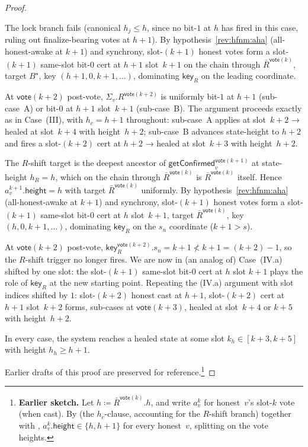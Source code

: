 \documentclass{article}
\newcommand{\height}{\mathsf{height}}
\newcommand{\key}{\mathsf{key}}
\newcommand{\vote}{\mathsf{vote}}
\newcommand{\comm}[1]{\bar{#1}}
\newcommand{\getConfirmed}{\textsf{getConfirmed}\xspace}
\theoremstyle{plain}
\theoremstyle{definition}
\theoremstyle{remark}
\newcommand{\AHA}{all-honest-awake\xspace}
\begin{document}
\begin{proof}
\begin{description}
\begin{description}
The lock branch fails (canonical $h_j \leq h$, since no bit-$1$ at $h$ has fired in this case, ruling out finalize-bearing votes at $h+1$). By hypothesis~\ref{rev:hfnm:aha} (\AHA at $k+1$) and synchrony, slot-$(k+1)$ honest votes form a slot-$(k+1)$ same-slot bit-$0$ cert at $h+1$ slot~$k+1$ on the chain through $\comm{R}^{\vote(k)}$, target $B^{\star}$, key $(h+1, 0, k+1, \ldots)$, dominating $\key_R$ on the leading coordinate.

At $\vote(k+2)$ post-vote, $\Sigma_v.R^{\vote(k+2)}$ is uniformly bit-$1$ at $h+1$ (sub-case~A) or bit-$0$ at $h+1$ slot~$k+1$ (sub-case~B). The argument proceeds exactly as in Case~(III), with $h_c = h+1$ throughout: sub-case~A applies  at slot~$k+2$ → healed at slot~$k+4$ with height~$h+2$; sub-case~B advances state-height to $h+2$ and fires a slot-$(k+2)$ cert at $h+2$ → healed at slot~$k+3$ with height~$h+2$.

\item[{(IV.b): $s < k$ — $R$-shift fires.}]\hfill

The $R$-shift target is the deepest ancestor of $\getConfirmed_v^{\vote(k+1)}$ at state-height $h_R = h$, which on the chain through $\comm{R}^{\vote(k)}$ is $\comm{R}^{\vote(k)}$ itself. Hence $a^{k+1}_v.\height = h$ with target $\comm{R}^{\vote(k)}$ uniformly. By hypothesis~\ref{rev:hfnm:aha} (\AHA at $k+1$) and synchrony, slot-$(k+1)$ honest votes form a slot-$(k+1)$ same-slot bit-$0$ cert at $h$ slot~$k+1$, target $\comm{R}^{\vote(k)}$, key $(h, 0, k+1, \ldots)$, dominating $\key_R$ on the $s_n$ coordinate ($k+1 > s$).

At $\vote(k+2)$ post-vote, $\key_R^{\vote(k+2)}.s_n = k+1 \not< k+1 = (k+2) - 1$, so the $R$-shift trigger no longer fires. We are now in (an analog of) Case~(IV.a) shifted by one slot: the slot-$(k+1)$ same-slot bit-$0$ cert at $h$ slot $k+1$ plays the role of $\key_R$ at the new starting point. Repeating the (IV.a) argument with slot indices shifted by $1$: slot-$(k+2)$ honest cast at $h+1$, slot-$(k+2)$ cert at $h+1$ slot~$k+2$ forms, sub-cases at $\vote(k+3)$, healed at slot~$k+4$ or $k+5$ with height~$h+2$.
\end{description}
\end{description}

In every case, the system reaches a healed state at some slot $k_h \in [k+3, k+5]$ with height $h_h \geq h+1$.

\noindent Earlier drafts of this proof are preserved for reference.\footnote{\textbf{Earlier sketch.} Let $h \coloneqq \comm{R}^{\vote(k)}.h$, and write $a^k_v$ for honest~$v$'s slot-$k$ vote (when cast). By  (the $h_c$-clause, accounting for the $R$-shift branch) together with , $a^k_v.\height \in \{h, h+1\}$ for every honest~$v$, splitting on the vote heights.

}
\end{proof}
\end{document}

